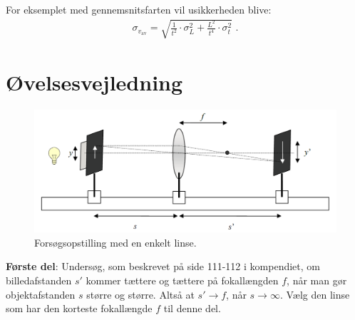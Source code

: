 \documentclass[a4paper,oneside,article,11pt]{memoir}
\begin{document}
For eksemplet med gennemsnitsfarten vil usikkerheden blive:
\begin{align*}
\sigma_{v_\text{av}}  = \sqrt{\frac{1}{t^2} \cdot \sigma_L^2 + \frac{L^2}{t^4} \cdot \sigma_t^2} \, \, .
\end{align*}
\newpage

\section*{Øvelsesvejledning}

\begin{figure}[h!]
	\centering
	\includegraphics[scale=0.55]{linse-opstilling.png}
	\caption{Forsøgsopstilling med en enkelt linse.}
\end{figure}

\textbf{Første del}:
Undersøg, som beskrevet på side 111-112 i kompendiet, om billedafstanden $s'$ kommer tættere og tættere på fokallængden $f$, når man gør objektafstanden $s$ større og større. Altså at $s' \rightarrow f$, når $s \rightarrow \infty$. Vælg den linse som har den korteste fokallængde $f$ til denne del.\\
\end{document}
